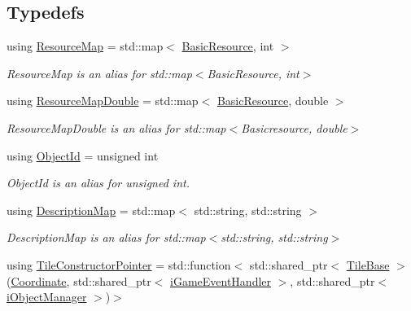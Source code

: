 \subsection*{Typedefs}
\begin{DoxyCompactItemize}
\item 
using \hyperlink{namespaceCourse_ab9a46ed9cd00485e318e5731ea2f78d9}{Resource\-Map} = std\-::map$<$ \hyperlink{namespaceCourse_a02d49c04029594d4adba79b84bb85f65}{Basic\-Resource}, int $>$
\begin{DoxyCompactList}\small\item\em Resource\-Map is an alias for std\-::map$<$\-Basic\-Resource, int$>$ \end{DoxyCompactList}\item 
using \hyperlink{namespaceCourse_a0b96bae1a664dde34efbb1b42dea615e}{Resource\-Map\-Double} = std\-::map$<$ \hyperlink{namespaceCourse_a02d49c04029594d4adba79b84bb85f65}{Basic\-Resource}, double $>$
\begin{DoxyCompactList}\small\item\em Resource\-Map\-Double is an alias for std\-::map$<$\-Basicresource, double$>$ \end{DoxyCompactList}\item 
using \hyperlink{namespaceCourse_a9a16e743c9813da00109e4991afd2f3e}{Object\-Id} = unsigned int
\begin{DoxyCompactList}\small\item\em Object\-Id is an alias for unsigned int. \end{DoxyCompactList}\item 
using \hyperlink{namespaceCourse_aed04c39dde5a591d4b353686d3d0e306}{Description\-Map} = std\-::map$<$ std\-::string, std\-::string $>$
\begin{DoxyCompactList}\small\item\em Description\-Map is an alias for std\-::map$<$std\-::string, std\-::string$>$ \end{DoxyCompactList}\item 
using \hyperlink{namespaceCourse_acf802ffd79a9573eb8afca22ae1f8a2f}{Tile\-Constructor\-Pointer} = std\-::function$<$ std\-::shared\-\_\-ptr$<$ \hyperlink{classCourse_1_1TileBase}{Tile\-Base} $>$(\hyperlink{classCourse_1_1Coordinate}{Coordinate}, std\-::shared\-\_\-ptr$<$ \hyperlink{classCourse_1_1iGameEventHandler}{i\-Game\-Event\-Handler} $>$, std\-::shared\-\_\-ptr$<$ \hyperlink{classCourse_1_1iObjectManager}{i\-Object\-Manager} $>$)$>$
\end{DoxyCompactItemize}
